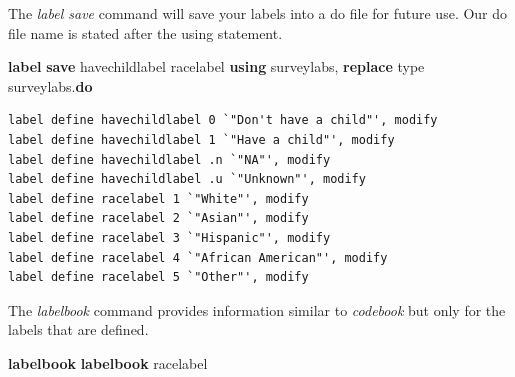 \documentclass[
]{book}
\newenvironment{Shaded}{\begin{snugshade}}{\end{snugshade}}
\newcommand{\DecValTok}[1]{\textcolor[rgb]{0.00,0.00,0.81}{#1}}
\newcommand{\KeywordTok}[1]{\textcolor[rgb]{0.13,0.29,0.53}{\textbf{#1}}}
\newcommand{\NormalTok}[1]{#1}
\begin{document}
The \emph{label save} command will save your labels into a do file for future use. Our do file name is stated after the using statement.

\begin{Shaded}
\begin{Highlighting}[]
\KeywordTok{label} \KeywordTok{save}\NormalTok{ havechildlabel racelabel }\KeywordTok{using}\NormalTok{ surveylabs, }\KeywordTok{replace}
\DecValTok{type}\NormalTok{ surveylabs.}\KeywordTok{do}
\end{Highlighting}
\end{Shaded}

\begin{verbatim}
label define havechildlabel 0 `"Don't have a child"', modify
label define havechildlabel 1 `"Have a child"', modify
label define havechildlabel .n `"NA"', modify
label define havechildlabel .u `"Unknown"', modify
label define racelabel 1 `"White"', modify
label define racelabel 2 `"Asian"', modify
label define racelabel 3 `"Hispanic"', modify
label define racelabel 4 `"African American"', modify
label define racelabel 5 `"Other"', modify
\end{verbatim}

The \emph{labelbook} command provides information similar to \emph{codebook} but only for the labels that are defined.

\begin{Shaded}
\begin{Highlighting}[]
\KeywordTok{labelbook}
\KeywordTok{labelbook}\NormalTok{ racelabel}
\end{Highlighting}
\end{Shaded}
\end{document}
